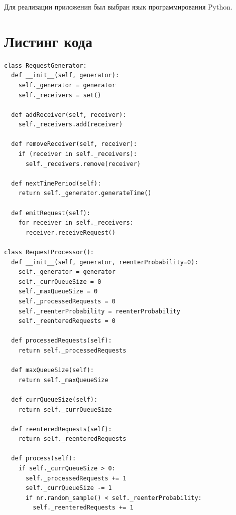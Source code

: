 \documentclass[12pt]{report}
\begin{document}
Для реализации приложения был выбран язык программирования Python.

\clearpage
\section*{Листинг кода}

\begin{lstlisting}
class RequestGenerator:
  def __init__(self, generator):
    self._generator = generator
    self._receivers = set()

  def addReceiver(self, receiver):
    self._receivers.add(receiver)

  def removeReceiver(self, receiver):
    if (receiver in self._receivers):
      self._receivers.remove(receiver)

  def nextTimePeriod(self):
    return self._generator.generateTime()

  def emitRequest(self):
    for receiver in self._receivers:
      receiver.receiveRequest()
      
class RequestProcessor():
  def __init__(self, generator, reenterProbability=0):
    self._generator = generator
    self._currQueueSize = 0
    self._maxQueueSize = 0
    self._processedRequests = 0
    self._reenterProbability = reenterProbability
    self._reenteredRequests = 0

  def processedRequests(self):
    return self._processedRequests

  def maxQueueSize(self):
    return self._maxQueueSize

  def currQueueSize(self):
    return self._currQueueSize

  def reenteredRequests(self):
    return self._reenteredRequests

  def process(self):
    if self._currQueueSize > 0:
      self._processedRequests += 1
      self._currQueueSize -= 1
      if nr.random_sample() < self._reenterProbability:
        self._reenteredRequests += 1
\end{lstlisting}
\clearpage
\end{document}
